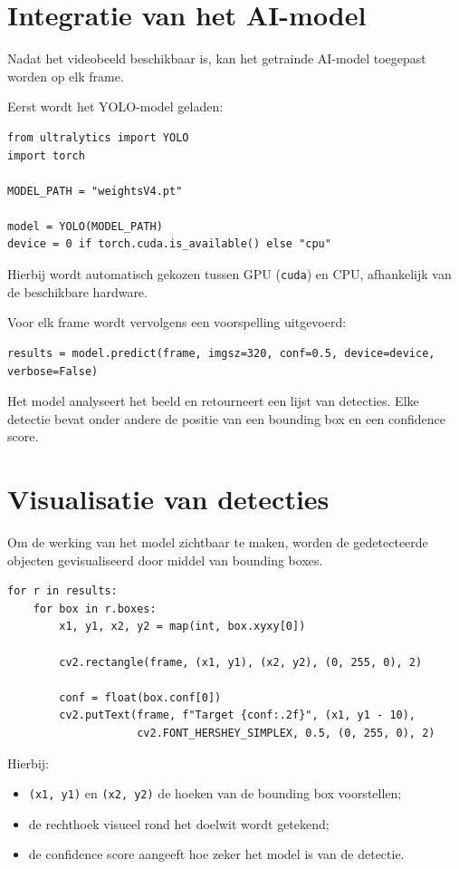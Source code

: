 \section{Integratie van het AI-model}

Nadat het videobeeld beschikbaar is, kan het getrainde AI-model toegepast worden op elk frame.

Eerst wordt het YOLO-model geladen:

\begin{verbatim}
from ultralytics import YOLO
import torch

MODEL_PATH = "weightsV4.pt"

model = YOLO(MODEL_PATH)
device = 0 if torch.cuda.is_available() else "cpu"
\end{verbatim}

Hierbij wordt automatisch gekozen tussen GPU (\texttt{cuda}) en CPU, afhankelijk van de beschikbare hardware.

Voor elk frame wordt vervolgens een voorspelling uitgevoerd:

\begin{verbatim}
results = model.predict(frame, imgsz=320, conf=0.5, device=device, verbose=False)
\end{verbatim}

Het model analyseert het beeld en retourneert een lijst van detecties. Elke detectie bevat onder andere de positie van een bounding box en een confidence score.

\section{Visualisatie van detecties}

Om de werking van het model zichtbaar te maken, worden de gedetecteerde objecten gevisualiseerd door middel van bounding boxes.

\begin{verbatim}
for r in results:
    for box in r.boxes:
        x1, y1, x2, y2 = map(int, box.xyxy[0])

        cv2.rectangle(frame, (x1, y1), (x2, y2), (0, 255, 0), 2)

        conf = float(box.conf[0])
        cv2.putText(frame, f"Target {conf:.2f}", (x1, y1 - 10),
                    cv2.FONT_HERSHEY_SIMPLEX, 0.5, (0, 255, 0), 2)
\end{verbatim}

Hierbij:
\begin{itemize}
    \item \texttt{(x1, y1)} en \texttt{(x2, y2)} de hoeken van de bounding box voorstellen;
    \item de rechthoek visueel rond het doelwit wordt getekend;
    \item de confidence score aangeeft hoe zeker het model is van de detectie.
\end{itemize}


